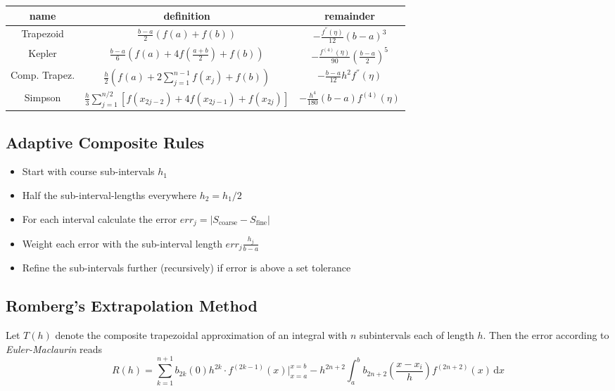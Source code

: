 \documentclass[
    a4paper,
    11pt
]{article}
\begin{document}
\begin{table}[H]
    \centering
    \begin{tabulary}{\linewidth}{C C C}
        \toprule
        name & definition & remainder\\
        \midrule
        Trapezoid &
            $\displaystyle \frac{b-a}{2} (f(a) + f(b)) $ &
            $\displaystyle -\frac{f^{''}(\eta)}{12}(b-a)^3$
        \\
        Kepler &
            $\displaystyle \frac{b-a}{6} \left( f(a) + 4f(\frac{a+b}{2}) + f(b)
            \right)$ &
            $\displaystyle - \frac{f^{(4)}(\eta)}{90} \left(\frac{b-a}{2}
            \right)^5$
        \\
        \midrule
        Comp. Trapez. &
            $\displaystyle \frac{h}{2} \left( f(a) + 2 \sum_{j=1}^{n-1}f(x_j) +
            f(b) \right) $ &
            $\displaystyle - \frac{b-a}{12} h^2 f^{''}(\eta)$
        \\
        Simpson &
            $\displaystyle \frac{h}{3} \sum_{j=1}^{n/2} \left[ f(x_{2j-2}) + 4
            f(x_{2j-1}) + f(x_{2j}) \right] $ &
            $\displaystyle - \frac{h^4}{180}(b-a) f^{(4)}(\eta)$
        \\

        \bottomrule

    \end{tabulary}
\end{table}

\subsection{Adaptive Composite Rules}

\begin{itemize}
    \item Start with course sub-intervals $h_1$
    \item Half the sub-interval-lengths everywhere $h_2=h_1/2$
    \item For each interval calculate the error $err_j = |S_{\text{coarse}} -
        S_{\text{fine}}|$
    \item Weight each error with the sub-interval length $err_j \frac{h_j}{b-a}$
    \item Refine the sub-intervals further (recursively) if error is above a set
        tolerance
\end{itemize}

\subsection{Romberg's Extrapolation Method}
Let $T(h)$ denote the composite trapezoidal approximation of an integral with
$n$ subintervals each of length $h$. Then the error according to
\emph{Euler-Maclaurin} reads
\begin{equation}
    R(h) = \sum_{k=1}^{n+1} b_{2k}(0)h^{2k} \cdot f^{(2k -1)}(x)
    \bigg|_{x=a}^{x=b} - h^{2n+2} \int_a^b b_{2n+2}(\frac{x-x_i}{h})
    f^{(2n+2)}(x) \, \mathrm{d} x
\end{equation}
\end{document}
